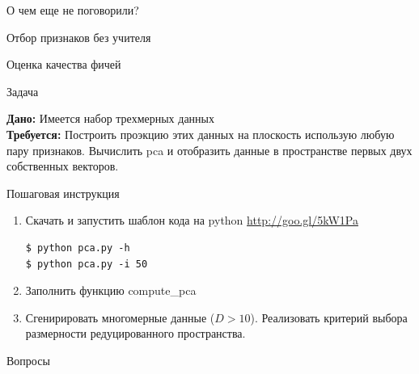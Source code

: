 \documentclass[10pt]{beamer}
\begin{document}
\begin{frame}{О чем еще не поговорили?}
\begin{block}{Отбор признаков без учителя}
\end{block}
\begin{block}{Оценка качества фичей}
\end{block}
\end{frame}

\begin{frame}[fragile]{Задача}

{\bf Дано:} Имеется набор трехмерных данных \\
{\bf Требуется:} Построить проэкцию этих данных на плоскость использую любую
пару признаков. Вычислить pca и отобразить данные в пространстве первых двух
собственных векторов.

\vspace{1em}
Пошаговая инструкция
\begin{enumerate}
\item Скачать и запустить шаблон кода на python \url{http://goo.gl/5kW1Pa}
\begin{shaded}
{\color{green} \begin{verbatim}
$ python pca.py -h
$ python pca.py -i 50
\end{verbatim}}
\end{shaded}
\item Заполнить функцию \textsf{compute\_pca}
\item Сгенирировать многомерные данные ($D > 10$). Реализовать критерий выбора
    размерности редуцированного пространства.
\end{enumerate}

\end{frame}

\begin{frame}[plain]
\begin{center}
{\Large Вопросы}
\end{center}
\end{frame}
\end{document}
